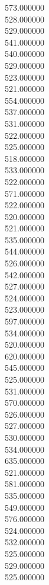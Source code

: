 573.000000\\
528.000000\\
529.000000\\
541.000000\\
540.000000\\
529.000000\\
523.000000\\
521.000000\\
554.000000\\
537.000000\\
531.000000\\
522.000000\\
525.000000\\
518.000000\\
533.000000\\
522.000000\\
571.000000\\
522.000000\\
520.000000\\
521.000000\\
535.000000\\
544.000000\\
526.000000\\
542.000000\\
527.000000\\
524.000000\\
523.000000\\
597.000000\\
534.000000\\
520.000000\\
620.000000\\
545.000000\\
525.000000\\
531.000000\\
570.000000\\
526.000000\\
527.000000\\
530.000000\\
534.000000\\
635.000000\\
521.000000\\
581.000000\\
535.000000\\
549.000000\\
576.000000\\
524.000000\\
532.000000\\
525.000000\\
529.000000\\
525.000000\\
